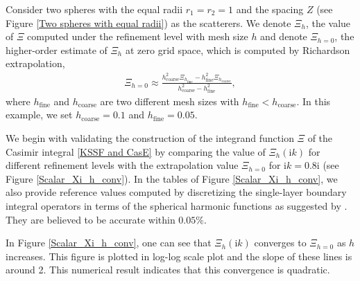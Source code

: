 Consider two spheres with the equal radii $r_1 = r_2 = 1$ and the spacing $Z$ (see Figure \ref{Two spheres with equal radii}) as the scatterers.
We denote $\Xi_{h}$, the value of $\Xi$ computed under the refinement level with mesh size $h$ and denote $\Xi_{h = 0}$, the higher-order estimate of 
$\Xi_{h}$ at zero grid space, which is computed by Richardson extrapolation,
\begin{align}\label{Extrapolation formula}
    \Xi_{h = 0} \approx \frac{h_{\text{coarse}}^{2}\Xi_{h_\text{fine}}  - h_{\text{fine}}^{2}\Xi_{h_\text{coarse}}}{h_{\text{coarse}}^{2}  - h_{\text{fine}}^{2}},
\end{align}
where $h_{\text{fine}}$ and $h_{\text{coarse}}$ are two different mesh sizes with $h_{\text{fine}} < h_{\text{coarse}}$. In this example, we set $h_{\text{coarse}} = 0.1$ and $h_{\text{fine}} = 0.05$.

We begin with validating the construction of the integrand function $\Xi$ of the Casimir integral \eqref{KSSF and CasE} by comparing the value of 
$\Xi_{h}(\mathrm{i}k)$ for different refinement levels with the extrapolation value $\Xi_{h = 0}$ for $\mathrm{i}k = 0.8\mathrm{i}$ (see Figure \ref{Scalar_Xi_h_conv}). In the tables of 
Figure \ref{Scalar_Xi_h_conv}, we also provide reference values computed by discretizing the single-layer boundary integral operators in terms of the spherical harmonic functions as suggested by \cite{kenneth2008casimir}.
They are believed to be accurate within $0.05\%$.


In Figure \ref{Scalar_Xi_h_conv}, one can see that $\Xi_{h}(\mathrm{i}k)$ converges to $\Xi_{h = 0}$ as $h$ increases.
This figure is plotted in log-log scale plot and the slope of these lines is around 2. This numerical result indicates that this convergence is quadratic.

